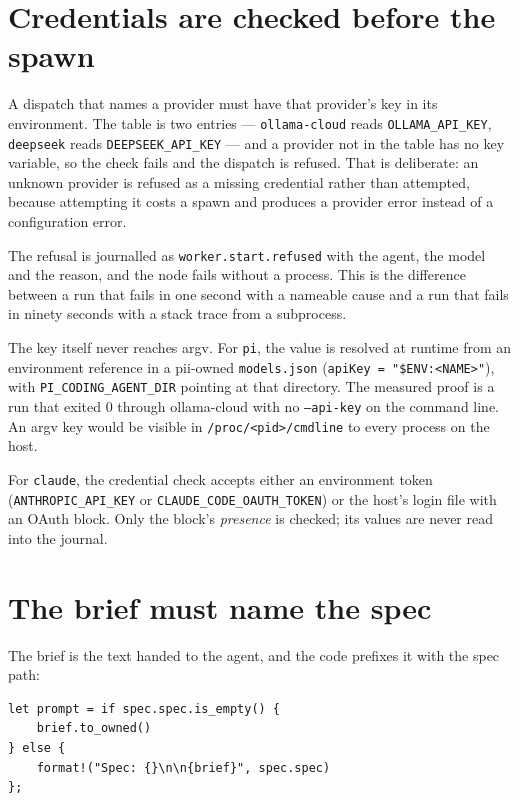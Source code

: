 \section{Credentials are checked before the spawn}

A dispatch that names a provider must have that provider's key in its environment. The table
is two entries --- \texttt{ollama-cloud} reads \texttt{OLLAMA\_API\_KEY}, \texttt{deepseek}
reads \texttt{DEEPSEEK\_API\_KEY} --- and a provider not in the table has no key variable, so
the check fails and the dispatch is refused. That is deliberate: an unknown provider is
refused as a missing credential rather than attempted, because attempting it costs a spawn and
produces a provider error instead of a configuration error.

The refusal is journalled as \texttt{worker.start.refused} with the agent, the model and the
reason, and the node fails without a process. This is the difference between a run that fails
in one second with a nameable cause and a run that fails in ninety seconds with a stack trace
from a subprocess.

The key itself never reaches argv. For \texttt{pi}, the value is resolved at runtime from an
environment reference in a pii-owned \texttt{models.json} (\texttt{apiKey = "\$ENV:<NAME>"}),
with \texttt{PI\_CODING\_AGENT\_DIR} pointing at that directory. The measured proof is a run
that exited 0 through ollama-cloud with no \texttt{--api-key} on the command line. An argv key
would be visible in \texttt{/proc/<pid>/cmdline} to every process on the host.

For \texttt{claude}, the credential check accepts either an environment token
(\texttt{ANTHROPIC\_API\_KEY} or \texttt{CLAUDE\_CODE\_OAUTH\_TOKEN}) or the host's login file
with an OAuth block. Only the block's \emph{presence} is checked; its values are never read
into the journal.

\section{The brief must name the spec}

The brief is the text handed to the agent, and the code prefixes it with the spec path:

\begin{lstlisting}[basicstyle=\ttfamily\footnotesize]
let prompt = if spec.spec.is_empty() {
    brief.to_owned()
} else {
    format!("Spec: {}\n\n{brief}", spec.spec)
};
\end{lstlisting}


